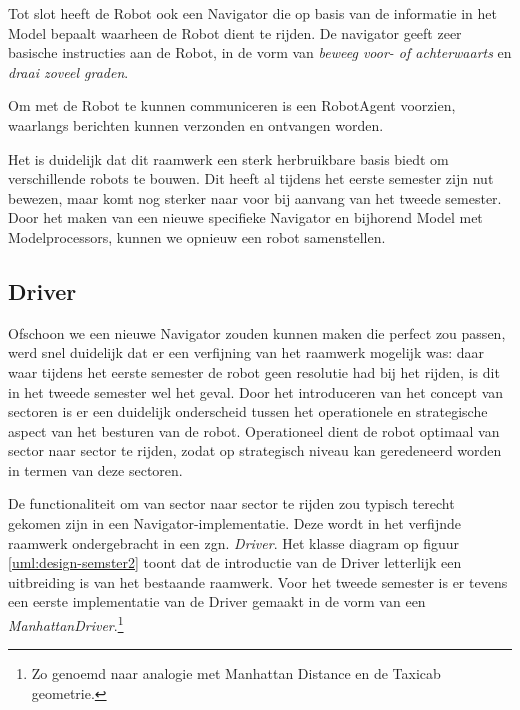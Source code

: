 \documentclass[12pt,a4paper]{report}
\begin{document}
Tot slot heeft de Robot ook een Navigator die op basis van de informatie in het Model bepaalt waarheen de Robot dient te rijden. De navigator geeft zeer basische instructies aan de Robot, in de vorm van \emph{beweeg voor- of achterwaarts} en \emph{draai zoveel graden}.

Om met de Robot te kunnen communiceren is een RobotAgent voorzien, waarlangs berichten kunnen verzonden en ontvangen worden.

Het is duidelijk dat dit raamwerk een sterk herbruikbare basis biedt om verschillende robots te bouwen. Dit heeft al tijdens het eerste semester zijn nut bewezen, maar komt nog sterker naar voor bij aanvang van het tweede semester. Door het maken van een nieuwe specifieke Navigator en bijhorend Model met Modelprocessors, kunnen we opnieuw een robot samenstellen.

\subsection{Driver}

Ofschoon we een nieuwe Navigator zouden kunnen maken die perfect zou passen, werd snel duidelijk dat er een verfijning van het raamwerk mogelijk was: daar waar tijdens het eerste semester de robot geen resolutie had bij het rijden, is dit in het tweede semester wel het geval. Door het introduceren van het concept van sectoren is er een duidelijk onderscheid tussen het operationele en strategische aspect van het besturen van de robot. Operationeel dient de robot optimaal van sector naar sector te rijden, zodat op strategisch niveau kan geredeneerd worden in termen van deze sectoren.

De functionaliteit om van sector naar sector te rijden zou typisch terecht gekomen zijn in een Navigator-implementatie. Deze wordt in het verfijnde raamwerk ondergebracht in een zgn. \emph{Driver}. Het klasse diagram op figuur \ref{uml:design-semster2} toont dat de introductie van de Driver letterlijk een uitbreiding is van het bestaande raamwerk. Voor het tweede semester is er tevens een eerste implementatie van de Driver gemaakt in de vorm van een \emph{ManhattanDriver}.\footnote{Zo genoemd naar analogie met Manhattan Distance en de Taxicab geometrie.} 
\end{document}
